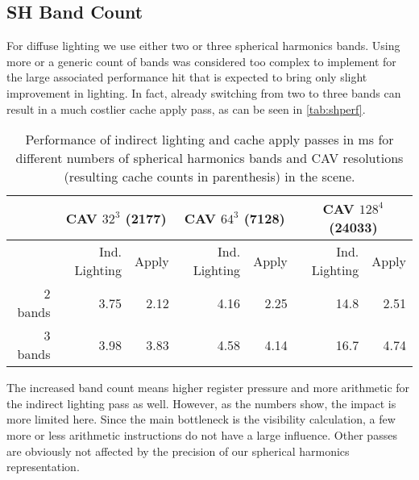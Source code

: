 \documentclass[thesis.tex]{subfiles}
\begin{document}
\subsection{SH Band Count} \label{sec:eva:shperf}
For diffuse lighting we use either two or three spherical harmonics bands.
Using more or a generic count of bands was considered too complex to implement for the large associated performance hit that is expected to bring only slight improvement in lighting.
In fact, already switching from two to three bands can result in a much costlier cache apply pass, as can be seen in \autoref{tab:shperf}.
\begin{table}[htbp]
  \centering
    \begin{tabular}{r|rr|rr|rr}
    \toprule
          & \multicolumn{2}{c|}{CAV $32^3$ (2177)} & \multicolumn{2}{c|}{CAV $64^3$ (7128)} & \multicolumn{2}{c}{CAV $128^4$ (24033)} \\
    \midrule
          & \small{Ind. Lighting} & Apply & Ind. Lighting & Apply & Ind. Lighting & Apply \\
    \midrule
    2 bands & 3.75  & 2.12  & 4.16  & 2.25  & 14.8  & 2.51 \\
    3 bands & 3.98  & 3.83  & 4.58  & 4.14  & 16.7  & 4.74 \\
    \bottomrule
    \end{tabular}
\caption{Performance of indirect lighting and cache apply passes in \si{\milli\second} for different numbers of spherical harmonics bands and CAV resolutions (resulting cache counts in parenthesis) in the  scene. }
\label{tab:shperf}
\end{table}
The increased band count means higher register pressure and more arithmetic for the indirect lighting pass as well.
However, as the numbers show, the impact is more limited here.
Since the main bottleneck is the visibility calculation, a few more or less arithmetic instructions do not have a large influence.
Other passes are obviously not affected by the precision of our spherical harmonics representation.
\end{document}
